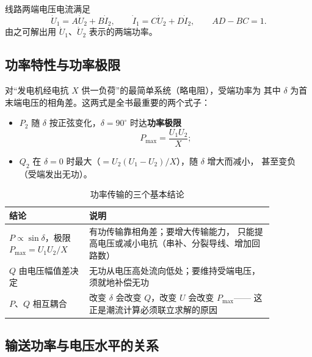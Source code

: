 线路两端电压电流满足
\begin{equation}
  \dot U_1=A\dot U_2+B\dot I_2,\qquad \dot I_1=C\dot U_2+D\dot I_2,
  \qquad AD-BC=1 .
\end{equation}
由之可解出用 $\dot U_1$、$\dot U_2$ 表示的两端功率。

\subsection{功率特性与功率极限}

对“发电机经电抗 $X$ 供一负荷”的最简单系统（略电阻），受端功率为
其中 $\delta$ 为首末端电压的相角差。这两式是全书最重要的两个式子：
\begin{itemize}
  \item $P_2$ 随 $\delta$ 按正弦变化，$\delta=90^\circ$ 时达\textbf{功率极限}
        \begin{equation}
          P_{\max}=\frac{U_1U_2}{X};
        \end{equation}
  \item $Q_2$ 在 $\delta=0$ 时最大（$=U_2(U_1-U_2)/X$），随 $\delta$ 增大而减小，
        甚至变负（受端发出无功）。
\end{itemize}

\begin{table}[htbp]
  \centering
  \caption{功率传输的三个基本结论}
  \small
  \begin{tabular}{@{}p{0.26\linewidth}p{0.60\linewidth}@{}}
    \toprule
    结论 & 说明 \\
    \midrule
    $P\propto\sin\delta$，极限 $P_{\max}=U_1U_2/X$ & 有功传输靠相角差；要增大传输能力，
      只能提高电压或减小电抗（串补、分裂导线、增加回路数） \\
    $Q$ 由电压幅值差决定 & 无功从电压高处流向低处；要维持受端电压，须就地补偿无功 \\
    $P$、$Q$ 相互耦合 & 改变 $\delta$ 会改变 $Q$，改变 $U$ 会改变 $P_{\max}$——
      这正是潮流计算必须联立求解的原因 \\
    \bottomrule
  \end{tabular}
\end{table}

\subsection{输送功率与电压水平的关系}

